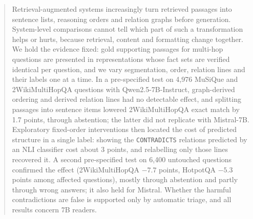 \begin{abstract}
Retrieval-augmented systems increasingly turn retrieved passages into sentence lists, reasoning orders and relation graphs before generation. System-level comparisons cannot tell which part of such a transformation helps or hurts, because retrieval, content and formatting change together. We hold the evidence fixed: gold supporting passages for multi-hop questions are presented in representations whose fact sets are verified identical per question, and we vary segmentation, order, relation lines and their labels one at a time. In a pre-specified test on 4{,}976 MuSiQue and 2WikiMultiHopQA questions with Qwen2.5-7B-Instruct, graph-derived ordering and derived relation lines had no detectable effect, and splitting passages into sentence items lowered 2WikiMultiHopQA exact match by 1.7 points, through abstention; the latter did not replicate with Mistral-7B. Exploratory fixed-order interventions then located the cost of predicted structure in a single label: showing the \texttt{CONTRADICTS} relations predicted by an NLI classifier cost about 3 points, and relabelling only those lines recovered it. A second pre-specified test on 6{,}400 untouched questions confirmed the effect (2WikiMultiHopQA $-7.7$ points, HotpotQA $-5.3$ points among affected questions), mostly through abstention and partly through wrong answers; it also held for Mistral. Whether the harmful contradictions are false is supported only by automatic triage, and all results concern 7B readers.
\end{abstract}
